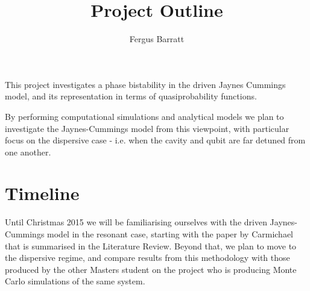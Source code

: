 \documentclass[reqno]{amsart}
\title{Project Outline}
\author{Fergus Barratt}
\begin{document}
\maketitle

This project investigates a phase bistability in the driven Jaynes Cummings model, and its representation in terms of quasiprobability functions. 

By performing computational simulations and analytical models we plan to investigate the Jaynes-Cummings model from this viewpoint, with particular focus on the dispersive case - i.e. when the cavity and qubit are far detuned from one another. 

\section{Timeline}
Until Christmas 2015 we will be familiarising ourselves with the driven Jaynes-Cummings model in the resonant case, starting with the paper by Carmichael that is summarised in the Literature Review. Beyond that, we plan to move to the dispersive regime, and compare results from this methodology with those produced by the other Masters student on the project who is producing Monte Carlo simulations of the same system.

\end{document}

